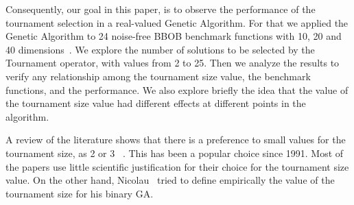  Consequently, our goal in this paper, is to observe the performance of the tournament selection in a real-valued Genetic Algorithm. For that we applied the Genetic Algorithm to 24 noise-free BBOB benchmark functions with 10, 20 and 40 dimensions~\cite{hansen2010real}. We explore the number of solutions to be selected by the Tournament operator, with values from 2 to 25. Then we analyze the results to verify any relationship among the tournament size value, the benchmark functions, and the performance. We also explore briefly the idea that the value of the tournament size value had different effects at different points in the algorithm.

 A review of the literature shows that there is a preference to small values for the tournament size, as 2 or 3 ~\cite{goldberg1991real, goldberg1993toward, agrawal1995simulated, harik1999gambler, tsutsui1999multi, harik1999compact, deb2000efficient, beyer2001self,kaelo2007integrated, bhunia2009application,  nicolau2009application, sawyerr2011comparative, sawyerr2015benchmarking}. This has been a popular choice since 1991. Most of the papers use little scientific justification for their choice for the tournament size value. On the other hand, Nicolau~\cite{nicolau2009application} tried to define empirically the value of the tournament size for his binary GA.
 
 